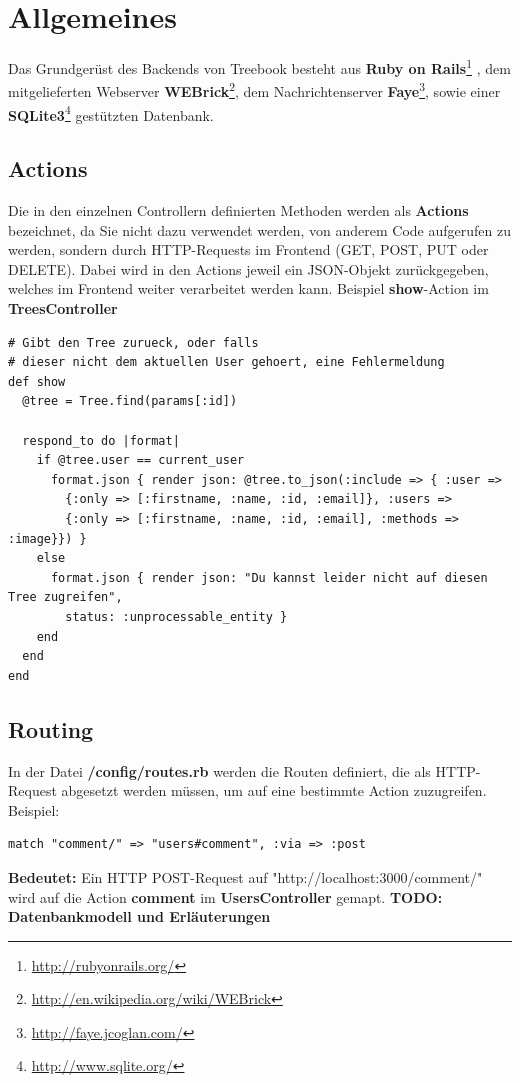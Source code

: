 \documentclass[10pt,a4paper]{book}
\begin{document}
\section{Allgemeines}
Das Grundgerüst des Backends von Treebook besteht aus \textbf{Ruby on Rails}\footnote{\href{http://rubyonrails.org/}{http://rubyonrails.org/}}
, dem mitgelieferten Webserver \textbf{WEBrick}\footnote{\href{http://en.wikipedia.org/wiki/WEBrick}{http://en.wikipedia.org/wiki/WEBrick}}, 
dem Nachrichtenserver \textbf{Faye}\footnote{\href{http://faye.jcoglan.com/}{http://faye.jcoglan.com/}}, sowie einer \textbf{SQLite3}\footnote{\href{http://www.sqlite.org/}{http://www.sqlite.org/}} gestützten Datenbank.
\subsection{Actions}
Die in den einzelnen Controllern definierten Methoden werden als \textbf{Actions} bezeichnet, da Sie nicht dazu verwendet werden, von anderem Code aufgerufen zu werden, sondern durch HTTP-Requests im Frontend (GET, POST, PUT oder DELETE). Dabei wird in den Actions jeweil ein JSON-Objekt zurückgegeben, welches im Frontend weiter verarbeitet werden kann.
Beispiel \textbf{show}-Action im \textbf{TreesController}
\begin{lstlisting}
# Gibt den Tree zurueck, oder falls
# dieser nicht dem aktuellen User gehoert, eine Fehlermeldung
def show
  @tree = Tree.find(params[:id])

  respond_to do |format|
    if @tree.user == current_user
      format.json { render json: @tree.to_json(:include => { :user => 
      	{:only => [:firstname, :name, :id, :email]}, :users => 
      	{:only => [:firstname, :name, :id, :email], :methods => :image}}) }
    else
      format.json { render json: "Du kannst leider nicht auf diesen Tree zugreifen", 
      	status: :unprocessable_entity }
    end
  end
end
\end{lstlisting}
\subsection{Routing}
In der Datei \textbf{/config/routes.rb} werden die Routen definiert, die als HTTP-Request abgesetzt werden müssen, um auf eine bestimmte Action zuzugreifen.
Beispiel:
\begin{lstlisting}
match "comment/" => "users#comment", :via => :post
\end{lstlisting}
\textbf{Bedeutet:} Ein HTTP POST-Request auf "http://localhost:3000/comment/" wird auf die Action \textbf{comment} im \textbf{UsersController} gemapt.
\textbf{TODO: Datenbankmodell und Erläuterungen}
\end{document}
